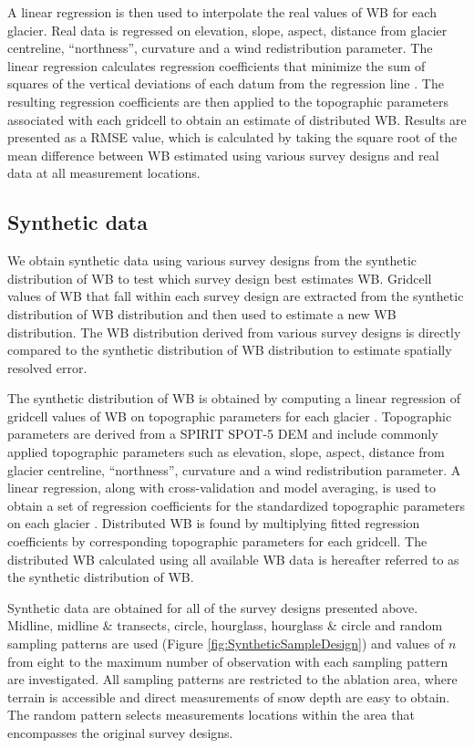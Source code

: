 \documentclass{article}
\begin{document}
A linear regression is then used to interpolate the real values of WB for each glacier. Real data is regressed on elevation, slope, aspect, distance from glacier centreline, ``northness'', curvature and a wind redistribution parameter. The linear regression calculates regression coefficients that minimize the sum of squares of the vertical deviations of each datum from the regression line  \parencite{Davis1986}. The resulting regression coefficients are then applied to the topographic parameters associated with each gridcell to obtain an estimate of distributed WB. Results are presented as a RMSE value, which is calculated by taking the square root of the mean difference between WB estimated using various survey designs and real data at all measurement locations.


\subsection{Synthetic data}

We obtain synthetic data using various survey designs from the synthetic distribution of WB to test which survey design best estimates WB. Gridcell values of WB that fall within each survey design are extracted from the synthetic distribution of WB distribution and then used to estimate a new WB distribution. The WB distribution derived from various survey designs is directly compared to the synthetic distribution of WB distribution to estimate spatially resolved error. 

The synthetic distribution of WB is obtained by computing a linear regression of gridcell values of WB on topographic parameters for each glacier  \parencite{Pulwicki2017}. Topographic parameters are derived from a SPIRIT SPOT-5 DEM  \parencite{Korona2009} and include commonly applied topographic parameters  \parencite[e.g.][]{McGrath2015} such as elevation, slope, aspect, distance from glacier centreline, ``northness'', curvature and a wind redistribution parameter. A linear regression, along with cross-validation and model averaging, is used to obtain a set of regression coefficients for the standardized topographic parameters on each glacier  \parencite{Pulwicki2017}. Distributed WB is found by multiplying fitted regression coefficients by corresponding topographic parameters for each gridcell. The distributed WB calculated using all available WB data is hereafter referred to as the synthetic distribution of WB.

Synthetic data are obtained for all of the survey designs presented above. Midline, midline \& transects, circle, hourglass, hourglass \& circle and random sampling patterns are used (Figure \ref{fig:SyntheticSampleDesign}) and values of $n$ from eight to the maximum number of observation with each sampling pattern are investigated. All sampling patterns are restricted to the ablation area, where terrain is accessible and direct measurements of snow depth are easy to obtain. The random pattern selects measurements locations within the area that encompasses the original survey designs.
\end{document}
